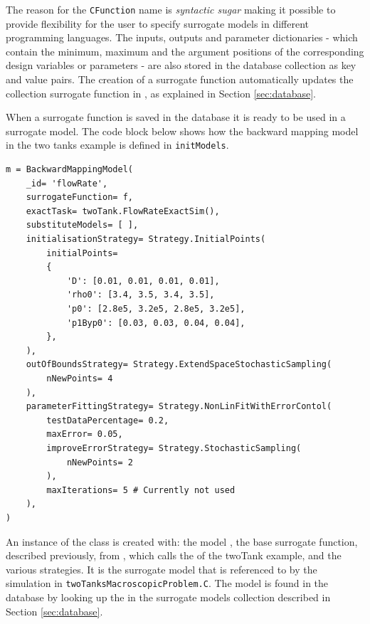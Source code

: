 %
The reason for the \texttt{CFunction} name is \emph{syntactic sugar} making it possible to provide flexibility for the user to specify surrogate models in different programming languages. 
The inputs, outputs and parameter dictionaries - which contain the minimum, maximum and the argument positions of the corresponding design variables or parameters - are also stored in the database collection as key and value pairs.
The creation of a surrogate function automatically updates the collection surrogate function in {\MongoDB}, as explained in Section \ref{sec:database}.
%
\par
%
When a surrogate function is saved in the database it is ready to be used in a surrogate model.
The code block below shows how the backward mapping model in the two tanks example is defined in \texttt{initModels}.
%
\begin{lstlisting}[style=Python, firstnumber=89]
m = BackwardMappingModel(
    _id= 'flowRate',
    surrogateFunction= f,
    exactTask= twoTank.FlowRateExactSim(),
    substituteModels= [ ],
    initialisationStrategy= Strategy.InitialPoints(
        initialPoints=
        {
            'D': [0.01, 0.01, 0.01, 0.01],
            'rho0': [3.4, 3.5, 3.4, 3.5],
            'p0': [2.8e5, 3.2e5, 2.8e5, 3.2e5],
            'p1Byp0': [0.03, 0.03, 0.04, 0.04],
        },
    ),
    outOfBoundsStrategy= Strategy.ExtendSpaceStochasticSampling(
        nNewPoints= 4
    ),
    parameterFittingStrategy= Strategy.NonLinFitWithErrorContol(
        testDataPercentage= 0.2,
        maxError= 0.05,
        improveErrorStrategy= Strategy.StochasticSampling(
            nNewPoints= 2
        ),
        maxIterations= 5 # Currently not used
    ),
)
\end{lstlisting}
%
An instance of the {\classSurrogateModel} class is created with: the model {\id}, the base surrogate function, described previously, {\FlowRateExactSim} from {\twoTank}, which calls the {\exactTask} of the twoTank example, and the various strategies.
It is the surrogate model that is referenced to by the simulation in \texttt{twoTanksMacroscopicProblem.C}. 
The model is found in the database by looking up the {\id} in the surrogate models collection described in Section \ref{sec:database}.
